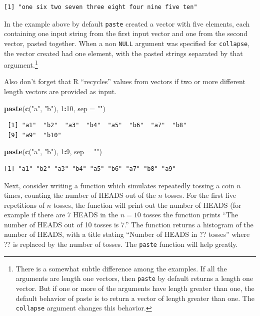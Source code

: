 \documentclass[
]{krantz}
\makeatletter
\newenvironment{Shaded}{\begin{snugshade}}{\end{snugshade}}
\newcommand{\DataTypeTok}[1]{\textcolor[rgb]{0.27,0.27,0.27}{#1}}
\newcommand{\DecValTok}[1]{\textcolor[rgb]{0.06,0.06,0.06}{#1}}
\newcommand{\KeywordTok}[1]{\textcolor[rgb]{0.27,0.27,0.27}{\textbf{#1}}}
\newcommand{\NormalTok}[1]{#1}
\newcommand{\OperatorTok}[1]{\textcolor[rgb]{0.43,0.43,0.43}{\textbf{#1}}}
\newcommand{\StringTok}[1]{\textcolor[rgb]{0.5,0.5,0.5}{#1}}
\newenvironment{kframe}{%
\medskip{}
\setlength{\fboxsep}{.8em}
 \def\at@end@of@kframe{}%
 \ifinner\ifhmode%
  \def\at@end@of@kframe{\end{minipage}}%
  \begin{minipage}{\columnwidth}%
 \fi\fi%
 \def\FrameCommand##1{\hskip\@totalleftmargin \hskip-\fboxsep
 \colorbox{shadecolor}{##1}\hskip-\fboxsep
     \hskip-\linewidth \hskip-\@totalleftmargin \hskip\columnwidth}%
 \MakeFramed {\advance\hsize-\width
   \@totalleftmargin\z@ \linewidth\hsize
   \@setminipage}}%
 {\par\unskip\endMakeFramed%
 \at@end@of@kframe}
\renewenvironment{Shaded}{\begin{kframe}}{\end{kframe}}
\makeatother
\begin{document}
\begin{verbatim}
[1] "one six two seven three eight four nine five ten"
\end{verbatim}

In the example above by default \texttt{paste} created a vector with five elements, each containing one input string from the first input vector and one from the second vector, pasted together. When a non \texttt{NULL} argument was specified for \texttt{collapse}, the vector created had one element, with the pasted strings separated by that argument.\footnote{There is a somewhat subtle difference among the examples. If all the arguments are length one vectors, then \texttt{paste} by default returns a length one vector. But if one or more of the arguments have length greater than one, the default behavior of paste is to return a vector of length greater than one. The \texttt{collapse} argument changes this behavior.}

Also don't forget that R ``recycles'' values from vectors if two or more different length vectors are provided as input.

\begin{Shaded}
\begin{Highlighting}[]
\KeywordTok{paste}\NormalTok{(}\KeywordTok{c}\NormalTok{(}\StringTok{"a"}\NormalTok{, }\StringTok{"b"}\NormalTok{), }\DecValTok{1}\OperatorTok{:}\DecValTok{10}\NormalTok{, }\DataTypeTok{sep =} \StringTok{""}\NormalTok{)}
\end{Highlighting}
\end{Shaded}

\begin{verbatim}
 [1] "a1"  "b2"  "a3"  "b4"  "a5"  "b6"  "a7"  "b8" 
 [9] "a9"  "b10"
\end{verbatim}

\begin{Shaded}
\begin{Highlighting}[]
\KeywordTok{paste}\NormalTok{(}\KeywordTok{c}\NormalTok{(}\StringTok{"a"}\NormalTok{, }\StringTok{"b"}\NormalTok{), }\DecValTok{1}\OperatorTok{:}\DecValTok{9}\NormalTok{, }\DataTypeTok{sep =} \StringTok{""}\NormalTok{)}
\end{Highlighting}
\end{Shaded}

\begin{verbatim}
[1] "a1" "b2" "a3" "b4" "a5" "b6" "a7" "b8" "a9"
\end{verbatim}

Next, consider writing a function which simulates repeatedly tossing a coin \(n\) times, counting the number of HEADS out of the \(n\) tosses. For the first five repetitions of \(n\) tosses, the function will print out the number of HEADS (for example if there are 7 HEADS in the \(n=10\) tosses the function prints ``The number of HEADS out of 10 tosses is 7.'' The function returns a histogram of the number of HEADS, with a title stating ``Number of HEADS in ?? tosses'' where ?? is replaced by the number of tosses. The \texttt{paste} function will help greatly.
\end{document}
